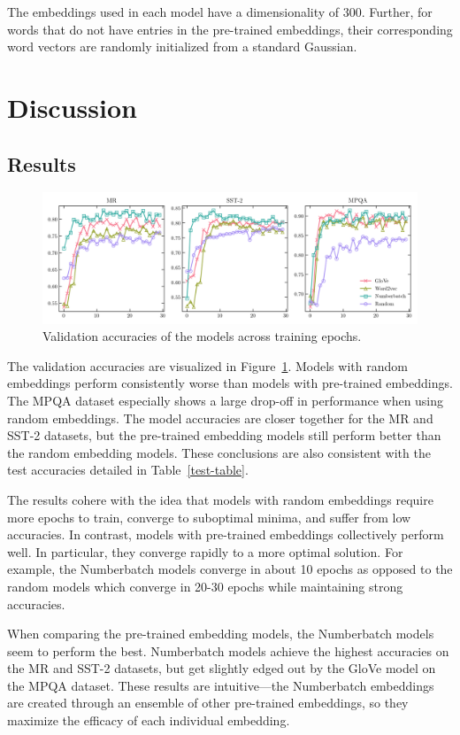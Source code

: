 \documentclass{article}
\begin{document}
The embeddings used in each model have a dimensionality of $300$. Further, for words that do not have entries in the pre-trained embeddings, their corresponding word vectors are randomly initialized from a standard Gaussian.


\section{Discussion}

\subsection{Results}

\begin{figure}
  \centering
  \includegraphics[width=5in]{validation.png}
  \caption{Validation accuracies of the models across training epochs.}
  \label{fig:validation}
\end{figure}

The validation accuracies are visualized in Figure~\ref{fig:validation}. Models with random embeddings perform consistently worse than models with pre-trained embeddings. The MPQA dataset especially shows a large drop-off in performance when using random embeddings. The model accuracies are closer together for the MR and SST-2 datasets, but the pre-trained embedding models still perform better than the random embedding models. These conclusions are also consistent with the test accuracies detailed in Table~\ref{test-table}. 

The results cohere with the idea that models with random embeddings require more epochs to train, converge to suboptimal minima, and suffer from low accuracies. In contrast, models with pre-trained embeddings collectively perform well. In particular, they converge rapidly to a more optimal solution. For example, the Numberbatch models converge in about 10 epochs as opposed to the random models which converge in 20-30 epochs while maintaining strong accuracies.

When comparing the pre-trained embedding models, the Numberbatch models seem to perform the best. Numberbatch models achieve the highest accuracies on the MR and SST-2 datasets, but get slightly edged out by the GloVe model on the MPQA dataset. These results are intuitive---the Numberbatch embeddings are created through an ensemble of other pre-trained embeddings, so they maximize the efficacy of each individual embedding.
\end{document}
